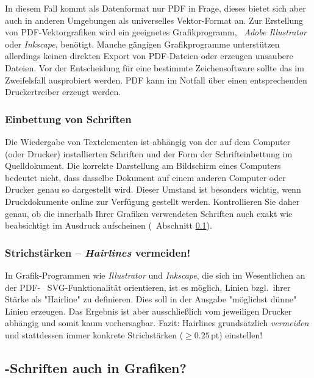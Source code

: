 In diesem Fall kommt als Datenformat nur PDF in Frage, dieses bietet sich
aber auch in anderen Umgebungen als universelles Vektor-Format an. Zur
Erstellung von PDF-Vektorgrafiken wird ein geeignetes Grafikprogramm, \zB\
\emph{Adobe Illustrator} oder \emph{Inkscape}, benötigt. Manche gängigen
Grafikprogramme unterstützen allerdings keinen direkten Export von PDF-Dateien
oder erzeugen unsaubere Dateien. Vor der Entscheidung für eine bestimmte
Zeichensoftware sollte das im Zweifelsfall ausprobiert werden. PDF kann im
Notfall über einen entsprechenden Druckertreiber erzeugt werden.


\subsubsection{Einbettung von Schriften}

Die Wiedergabe von Textelementen ist abhängig von der auf dem Computer (oder
Drucker) installierten Schriften und der Form der Schrifteinbettung im
Quelldokument. Die korrekte Darstellung am Bildschirm eines Computers
bedeutet nicht, dass dasselbe Dokument auf einem anderen Computer oder
Drucker genau so dargestellt wird. Dieser Umstand ist besonders wichtig, wenn
Druckdokumente online zur Verfügung gestellt werden. Kontrollieren Sie daher
genau, ob die innerhalb Ihrer Grafiken verwendeten Schriften auch exakt wie
beabsichtigt im Ausdruck aufscheinen 
(\sa\ Abschnitt \ref{sec:tex-schriften-in-grafiken}).


\subsubsection{Strichstärken -- \emph{Hairlines} vermeiden!}

In Grafik-Programmen wie \emph{Illustrator} und \emph{Inkscape}, die sich im
Wesentlichen an der PDF- \bzw\ SVG-Funktionalität orientieren, 
ist es möglich, Linien bzgl.\ ihrer Stärke als "Hairline" zu definieren. Dies 
soll in der Ausgabe "möglichst dünne" Linien erzeugen. Das Ergebnis ist 
aber ausschließlich vom jeweiligen Drucker abhängig und somit kaum 
vorhersagbar. Fazit: Hairlines grundsätzlich \emph{vermeiden} und stattdessen immer 
konkrete Strichstärken ($\geq 0.25\,\mathrm{pt}$) einstellen!


\subsection{\tex-Schriften auch in Grafiken?}
\label{sec:tex-schriften-in-grafiken}

